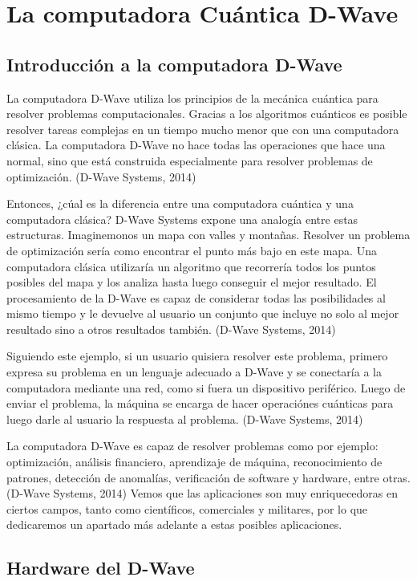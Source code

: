 \documentclass[11pt,a4paper]{article}
\begin{document}
\section*{La computadora Cuántica D-Wave}
\subsection*{Introducción a la computadora D-Wave}

La computadora D-Wave utiliza los principios de la mecánica cuántica para resolver problemas computacionales. Gracias a los algoritmos cuánticos es posible resolver tareas complejas en un tiempo mucho menor que con una computadora clásica. La computadora D-Wave no hace todas las operaciones que hace una normal, sino que está construida especialmente para resolver problemas de optimización. (D-Wave Systems, 2014)

Entonces, ¿cúal es la diferencia entre una computadora cuántica y una computadora clásica? D-Wave Systems expone una analogía entre estas estructuras. Imaginemonos un mapa con valles y montañas. Resolver un problema de optimización sería como encontrar el punto más bajo en este mapa. Una computadora clásica utilizaría un algoritmo que recorrería todos los puntos posibles del mapa y los analiza hasta luego conseguir el mejor resultado. El procesamiento de la D-Wave es capaz de considerar todas las posibilidades al mismo tiempo y le devuelve al usuario un conjunto que incluye no solo al mejor resultado sino a otros resultados también. (D-Wave Systems, 2014)

Siguiendo este ejemplo, si un usuario quisiera resolver este problema, primero expresa su problema en un lenguaje adecuado a D-Wave y se conectaría a la computadora mediante una red, como si fuera un dispositivo periférico. Luego de enviar el problema, la máquina se encarga de hacer operaciónes cuánticas para luego darle al usuario la respuesta al problema.  (D-Wave Systems, 2014)

La computadora D-Wave es capaz de resolver problemas como por ejemplo: optimización, análisis financiero, aprendizaje de máquina, reconocimiento de patrones, detección de anomalías, verificación de software y hardware, entre otras. (D-Wave Systems, 2014) Vemos que las aplicaciones son muy enriquecedoras en ciertos campos, tanto como científicos, comerciales y militares, por lo que dedicaremos un apartado más adelante a estas posibles aplicaciones.

\subsection*{Hardware del D-Wave}
\end{document}
